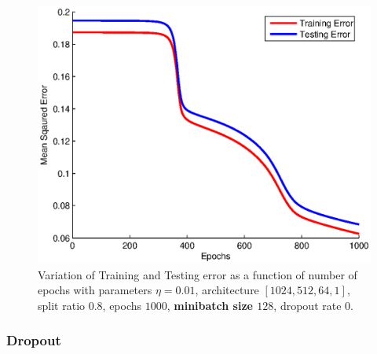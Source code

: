 \documentclass{article}
\newcommand{\myScale}{0.56}
\begin{document}
\begin{figure}[H]
\includegraphics[scale=\myScale]{../q2/part2_128}
\caption{Variation of Training and Testing error as a function of number of epochs with parameters $\eta=0.01$, architecture $[1024,512,64,1]$, split ratio $0.8$, epochs $1000$, {\bf minibatch size $128$}, dropout rate $0$.}
\label{fig:fig19}
\end{figure}
\subsubsection{Dropout}
\end{document}
